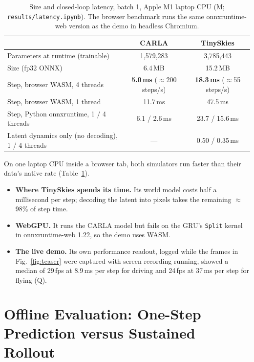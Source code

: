 \documentclass[11pt]{article}
\begin{document}
\begin{table}[!htbp]
  \centering
  \small
  \caption{Size and closed-loop latency, batch 1, Apple M1 laptop CPU (M; \texttt{results/latency.ipynb}). The browser benchmark runs the same onnxruntime-web version as the demo in headless Chromium.}
  \label{tab:latency}
  \begin{tabular}{@{}lcc@{}}
    \toprule
    & CARLA & TinySkies \\
    \midrule
    Parameters at runtime (trainable) & 1,579,283 & 3,785,443 \\
    Size (fp32 ONNX) & 6.4\,MB & 15.2\,MB \\
    Step, browser WASM, 4 threads & \textbf{5.0\,ms} ($\approx$200 steps/s) & \textbf{18.3\,ms} ($\approx$55 steps/s) \\
    Step, browser WASM, 1 thread & 11.7\,ms & 47.5\,ms \\
    Step, Python onnxruntime, 1 / 4 threads & 6.1 / 2.6\,ms & 23.7 / 15.6\,ms \\
    Latent dynamics only (no decoding), 1 / 4 threads & --- & 0.50 / 0.35\,ms \\
    \bottomrule
  \end{tabular}
\end{table}

On one laptop CPU inside a browser tab, both simulators run faster than their data's native rate (Table~\ref{tab:latency}).
\begin{itemize}
  \item \textbf{Where TinySkies spends its time.} Its world model costs half a millisecond per step; decoding the latent into pixels takes the remaining $\approx$98\% of step time.
  \item \textbf{WebGPU.} It runs the CARLA model but fails on the GRU's \texttt{Split} kernel in onnxruntime-web 1.22, so the demo uses WASM.
  \item \textbf{The live demo.} Its own performance readout, logged while the frames in Fig.~\ref{fig:teaser} were captured with screen recording running, showed a median of 29\,fps at 8.9\,ms per step for driving and 24\,fps at 37\,ms per step for flying (Q).
\end{itemize}

\section{Offline Evaluation: One-Step Prediction versus Sustained Rollout}
\label{sec:offline}
\end{document}
